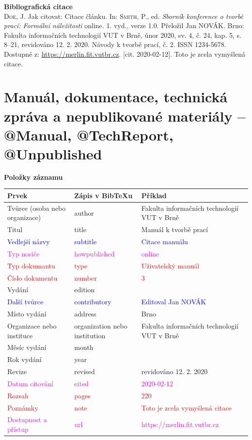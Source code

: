 \bigskip

\noindent \textbf{Bibliografická citace}\\
\textsc{Doe}, J. Jak citovat: Citace článku.
In: \textsc{Smith}, P., ed. \textit{Sborník konference o tvorbě prací: Formální náležitosti} online. 1. vyd., verze 1.0. Přeložil Jan NOVÁK. Brno: Fakulta informačních technologií VUT v Brně, únor 2020, sv. 4, č. 24, kap. 5, s. 8–21, revidováno 12. 2. 2020. Návody k tvorbě prací, č. 2. ISSN 1234-5678. Dostupné z: \url{https://merlin.fit.vutbr.cz}. [cit. 2020-02-12]. Toto je zcela vymyšlená citace.
\newpage
\section*{Manuál, dokumentace, technická zpráva a nepublikované materiály -- @Manual, @TechReport, @Unpublished}
\label{pr-manual}
\noindent \textbf{Položky záznamu}

\medskip

\begin{tabularx}{0.95\linewidth}{X X >{\raggedright\arraybackslash}X}
   Prvek & Zápis v BibTeXu & Příklad\\\hline
   Tvůrce (osoba nebo organizace) & author & Fakulta informačních technologií VUT v Brně\\
   Titul & title & Manuál k tvorbě prací\\
   \textcolor{blue}{Vedlejší názvy} & \textcolor{blue}{subtitle} & \textcolor{blue}{Citace manuálu}\\
   \textcolor{magenta}{Typ nosiče} & \textcolor{magenta}{howpublished} & \textcolor{magenta}{online}\\
   \textcolor{red}{Typ dokumantu} & \textcolor{red}{type} & \textcolor{red}{Uživatelský manuál}\\
   \textcolor{red}{Číslo dokumentu} & \textcolor{red}{number} & \textcolor{red}{3}\\
   Vydání & edition & 1\\
   \textcolor{blue}{Další tvůrce} & \textcolor{blue}{contributory} & \textcolor{blue}{Editoval Jan NOVÁK}\\
   Místo vydání & address & Brno\\
   Organizace nebo instituce & organization nebo institution & Fakulta informačních technologií VUT v Brně\\
   Měsíc vydání & month & 2\\
   Rok vydání & year & 2020\\
   Revize & revised & revidováno 12. 2. 2020\\
   \textcolor{magenta}{Datum citování} & \textcolor{magenta}{cited} & \textcolor{magenta}{2020-02-12}\\
   \textcolor{red}{Rozsah} & \textcolor{red}{pages} & \textcolor{red}{220}\\   
   \textcolor{red}{Poznámky} & \textcolor{red}{note} & \textcolor{red}{Toto je zcela vymyšlená citace}\\
   \textcolor{magenta}{Dostupnost a přístup} & \textcolor{magenta}{url} & \textcolor{magenta}{https://merlin.fit.vutbr.cz}\\
\end{tabularx}

